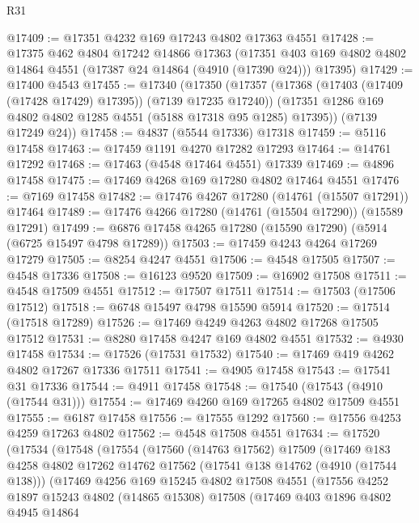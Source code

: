 \begin{lexlean}{R31}
\begin{coremodule}
@17409 := @17351 @4232 @169 @17243 @4802 @17363 @4551
@17428 := @17375
    @462
    @4804
    @17242
    @14866
    @17363
    (@17351 @403 @169 @4802 @4802 @14864 @4551 (@17387 @24 @14864 (@4910 (@17390 @24))) @17395)
@17429 := @17400 @4543
@17455 := @17340
    (@17350
      (@17357
        (@17368 (@17403 (@17409 (@17428 @17429) @17395)) (@7139 @17235 @17240))
        (@17351 @1286 @169 @4802 @4802 @1285 @4551 (@5188 @17318 @95 @1285) @17395))
      (@7139 @17249 @24))
@17458 := @4837 (@5544 @17336) @17318
@17459 := @5116 @17458
@17463 := @17459 @1191 @4270 @17282 @17293
@17464 := @14761 @17292
@17468 := @17463 (@4548 @17464 @4551) @17339
@17469 := @4896 @17458
@17475 := @17469 @4268 @169 @17280 @4802 @17464 @4551
@17476 := @7169 @17458
@17482 := @17476 @4267 @17280 (@14761 (@15507 @17291)) @17464
@17489 := @17476 @4266 @17280 (@14761 (@15504 @17290)) (@15589 @17291)
@17499 := @6876 @17458 @4265 @17280 (@15590 @17290) (@5914 (@6725 @15497 @4798 @17289))
@17503 := @17459 @4243 @4264 @17269 @17279
@17505 := @8254 @4247 @4551
@17506 := @4548 @17505
@17507 := @4548 @17336
@17508 := @16123 @9520
@17509 := @16902 @17508
@17511 := @4548 @17509 @4551
@17512 := @17507 @17511
@17514 := @17503 (@17506 @17512)
@17518 := @6748 @15497 @4798 @15590 @5914
@17520 := @17514 (@17518 @17289)
@17526 := @17469 @4249 @4263 @4802 @17268 @17505 @17512
@17531 := @8280 @17458 @4247 @169 @4802 @4551
@17532 := @4930 @17458
@17534 := @17526 (@17531 @17532)
@17540 := @17469 @419 @4262 @4802 @17267 @17336 @17511
@17541 := @4905 @17458
@17543 := @17541 @31 @17336
@17544 := @4911 @17458
@17548 := @17540 (@17543 (@4910 (@17544 @31)))
@17554 := @17469 @4260 @169 @17265 @4802 @17509 @4551
@17555 := @6187 @17458
@17556 := @17555 @1292
@17560 := @17556 @4253 @4259 @17263 @4802
@17562 := @4548 @17508 @4551
@17634 := @17520
    (@17534
      (@17548
        (@17554
          (@17560
            (@14763 @17562)
            @17509
            (@17469
              @183
              @4258
              @4802
              @17262
              @14762
              @17562
              (@17541 @138 @14762 (@4910 (@17544 @138)))
              (@17469
                @4256
                @169
                @15245
                @4802
                @17508
                @4551
                (@17556
                  @4252
                  @1897
                  @15243
                  @4802
                  (@14865 @15308)
                  @17508
                  (@17469
                    @403
                    @1896
                    @4802
                    @4945
                    @14864

\end{coremodule}
\end{lexlean}
